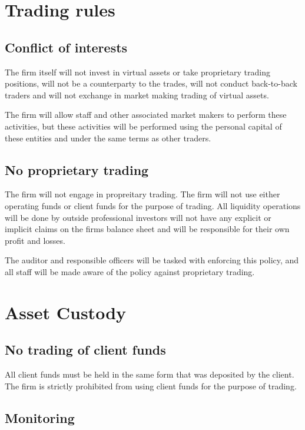 \section{Trading rules}

\subsection{Conflict of interests}
The firm itself will not invest in virtual assets or take proprietary
trading positions, will not be a counterparty to the trades, will not
conduct back-to-back traders and will not exchange in market making
trading of virtual assets.

The firm will allow staff and other associated market makers to
perform these activities, but these activities will be performed using
the personal capital of these entities and under the same terms as
other traders.

\subsection{No proprietary trading}

The firm will not engage in propreitary trading.  The firm will not
use either operating funds or client funds for the purpose of
trading.  All liquidity operations will be done by outside
professional investors will not have any explicit or implicit claims
on the firms balance sheet and will be responsible for their own
profit and losses.

The auditor and responsible officers will be tasked with enforcing
this policy, and all staff will be made aware of the policy against
proprietary trading.

\section{Asset Custody}
\subsection{No trading of client funds}
All client funds must be held in the same form that was deposited by
the client.  The firm is strictly prohibited from using client funds
for the purpose of trading.

\subsection{Monitoring}

